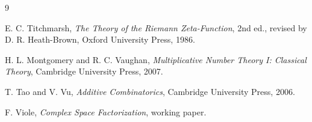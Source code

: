 \documentclass[11pt]{article}
\theoremstyle{definition}
\theoremstyle{remark}
\newcommand{\1}{\mathbf{1}}
\begin{document}
\begin{thebibliography}{9}

E. C. Titchmarsh,
\emph{The Theory of the Riemann Zeta-Function},
2nd ed., revised by D. R. Heath-Brown,
Oxford University Press, 1986.

H. L. Montgomery and R. C. Vaughan,
\emph{Multiplicative Number Theory I: Classical Theory},
Cambridge University Press, 2007.

T. Tao and V. Vu,
\emph{Additive Combinatorics},
Cambridge University Press, 2006.

F. Viole,
\emph{Complex Space Factorization},
working paper.

\end{thebibliography}
\end{document}
